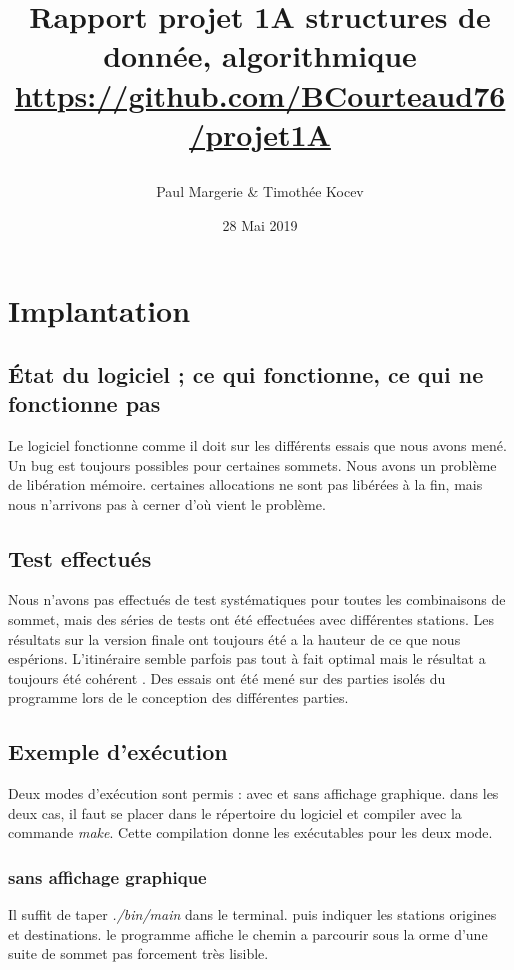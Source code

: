 \documentclass[12pt]{report}
\title{%
    \begin{minipage}\linewidth
        \centering
        Rapport projet 1A
        \vskip3pt
        \large structures de donnée, algorithmique
        \vskip5pt
        \large \url{https://github.com/BCourteaud76/projet1A}
    \end{minipage}
}
\author{Paul Margerie \& Timothée Kocev}
\date{28 Mai 2019}
\begin{document}
\maketitle
\renewcommand{\contentsname}{Sommaire} %
\renewcommand{\chaptername}{Chapitre} %
\tableofcontents

\chapter{Implantation}


\section{État du logiciel ; ce qui fonctionne, ce qui ne fonctionne pas}
Le logiciel fonctionne comme il doit sur les différents essais que nous avons mené. Un bug est toujours possibles pour certaines sommets. \newline Nous avons un problème de libération mémoire. certaines allocations ne sont pas libérées à la fin, mais nous n'arrivons pas à cerner d'où vient le problème.

\section{Test effectués}
Nous n'avons pas effectués de test systématiques pour toutes les combinaisons de sommet, mais des séries de tests ont été effectuées avec différentes stations. Les résultats sur la version finale ont toujours été a la hauteur de ce que nous espérions. L'itinéraire semble parfois pas tout à fait optimal mais le résultat a toujours été cohérent
. \newline Des essais ont été mené sur des parties isolés du programme lors de le conception des différentes parties.
\section{Exemple d'exécution}

Deux modes d'exécution sont permis : avec et sans affichage graphique. dans les deux cas, il faut se placer dans le répertoire du logiciel et compiler avec la commande \emph{make}. Cette compilation donne les exécutables pour les deux mode.


\subsection{sans affichage graphique}
Il suffit de taper \emph{./bin/main} dans le terminal. puis indiquer les stations origines et destinations. le programme affiche le chemin a parcourir sous la orme d'une suite de sommet pas forcement très lisible.
\end{document}

